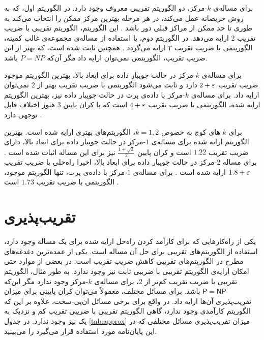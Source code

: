برای مساله‌ی $k$-مرکز، دو الگوریتم تقریبی معروف وجود دارد. در الگوریتم اول، که به روش حریصانه عمل می‌کند، در هر مرحله بهترین مرکز ممکن را انتخاب می‌کند به طوری تا حد ممکن از مراکز قبلی دور باشد \cite{megiddo1984complexity}. این الگوریتم، الگوریتم تقریبی با ضریب تقریب 2 ارایه می‌دهد. در الگوریتم دوم، با استفاده از مساله‌ی مجموعه‌ی غالب کمینه، الگوریتمی با ضریب تقریب ۲ ارایه می‌گردد \cite{vazirani2013approximation}. همچنین ثابت شده است، که بهتر از این ضریب تقریب، الگوریتمی نمی‌توان ارایه داد مگر آن‌که $P = NP$ باشد.

برای مساله‌ی $k$-مرکز در حالت جویبار داده برای ابعاد بالا، بهترین الگوریتم موجود ضریب تقریب $2 + \varepsilon$ دارد \cite{mccutchen2008streaming, guha2009tight, ahn2014computing} و ثابت می‌شود الگوریتمی با ضریب تقریب بهتر از $2$ نمی‌توان ارایه داد. برای مساله‌ی $k$-مرکز با داده‌ی پرت در حالت جویبار داده نیز، بهترین الگوریتم ارایه شده، الگوریتمی با ضریب تقریب $4 + \varepsilon$ است که با کران پایین $3$ هنوز اختلاف قابل توجهی دارد \cite{charikar2001algorithms}. 

برای $k$ های کوچ به خصوص $k =1, 2$، الگوریتم‌های بهتری ارایه شده است. بهترین الگوریتم ارایه شده برای مساله‌ی $1$-مرکز در حالت جویبار داده برای ابعاد بالا، دارای ضریب تقریب $1.22$ است و کران پایین $\frac{1 + \sqrt{2}}{2}$ نیز برای این مساله اثبات شده است \cite{agarwal2010streaming, chan2014streaming}. برای مساله $2$-مرکز در حالت جویبار داده برای ابعاد بالا، اخیرا راه‌حلی با ضریب تقریب $1.8 + \varepsilon$ ارایه شده است \cite{kim2014improved}. برای مساله‌ی $1$-مرکز با داده‌ی پرت، تنها الگوریتم موجود، الگوریتمی با ضریب تقریب $1.73$ است \cite{zarrabi2009streaming}.

\section{تقریب‌پذیری}
یکی از راه‌کارهایی که برای کارآمد کردن راه‌حل ارایه شده برای یک مساله وجود دارد، استفاده از الگوریتم‌های تقریبی برای حل آن مساله است. یکی از عمده‌ترین دغدغه‌های مطرح در الگوریتم‌های تقریبی کاهش ضریب تقریب است. در بعضی از موارد حتی امکان ارایه‌ی الگوریتم تقریبی با ضریبی ثابت نیز وجود ندارد. به طور مثال، الگوریتم تقریبی با ضریب تقریب کم‌تر از $2$، برای مساله‌ی $k$-مرکز وجود ندارد مگر این‌که $\mathsf{P} = \mathsf{NP}$ باشد. برای مسائل مختلف، معمولاً می‌توان کران پایینی برای میزان تقریب‌پذیری آن‌ها ارایه داد. در واقع برای برخی مسائل ان‌پی-سخت، علاوه بر این که الگوریتم کارآمدی وجود ندارد، گاهی الگوریتم تقریبی با ضریبی تقریب کم و نزدیک به یک نیز وجود ندارد. در جدول \ref{tab:approx} میزان تقریب‌پذیری مسائل مختلفی که در این پایان‌نامه مورد استفاده قرار می‌گیرد را می‌بینید.

